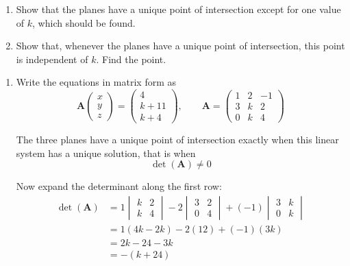 \documentclass[leqno]{article}
\begin{document}
\begin{enumerate}[
  label=\textbf{\arabic*.},
  leftmargin=*,
  topsep=0pt,
  partopsep=0pt,
  parsep=0pt
]
\begin{enumerate}[label=\textbf{(\alph*)}]
  \item Show that the planes have a unique point of intersection except for one value of $k$, which should be found.  \\
  \item Show that, whenever the planes have a unique point of intersection, this point is independent of $k$. Find the point.  \\
\end{enumerate}

\vspace*{10pt}

\begin{djsSolution}
\begin{enumerate}[label=\textbf{(\alph*)}]
  \item Write the equations in matrix form as
\[
\mathbf{A}\begin{pmatrix}x\\y\\z\end{pmatrix}
=
\begin{pmatrix}4\\k+11\\k+4\end{pmatrix},
\qquad
\mathbf{A}=
\begin{pmatrix}
1&2&-1\\
3&k&2\\
0&k&4
\end{pmatrix}
\]

The three planes have a unique point of intersection exactly when this linear system has a unique solution, that is when
\[
\det(\mathbf{A})\neq 0
\]

Now expand the determinant along the first row:
\begin{align*}
\det(\mathbf{A})
&=
1\begin{vmatrix}k&2\\k&4\end{vmatrix}
-2\begin{vmatrix}3&2\\0&4\end{vmatrix}
+(-1)\begin{vmatrix}3&k\\0&k\end{vmatrix}\\
&=1(4k-2k)-2(12)+(-1)(3k)\\
&=2k-24-3k\\
&=-(k+24)
\end{align*}


\end{enumerate}
\end{djsSolution}
\end{enumerate}
\end{document}
